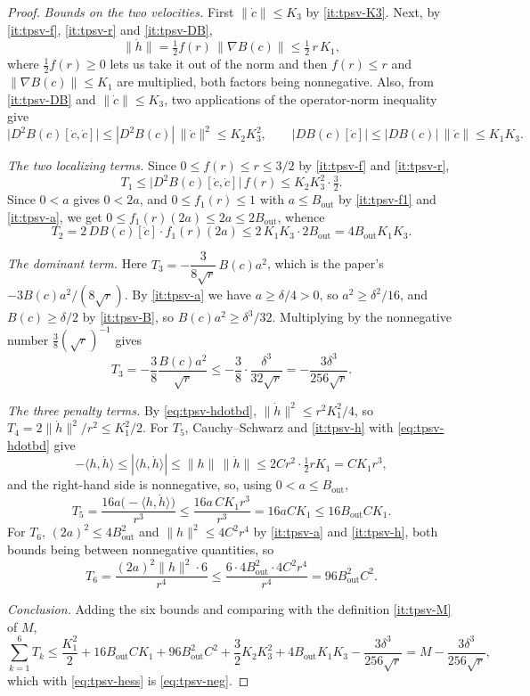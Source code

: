 \begin{proof}
\emph{Bounds on the two velocities.} First $\|\dot c\|\le K_3$ by
\ref{it:tpsv-K3}. Next, by \ref{it:tpsv-f}, \ref{it:tpsv-r} and
\ref{it:tpsv-DB},
\begin{equation}\label{eq:tpsv-hdotbd}
  \|\dot h\|=\tfrac12f(r)\,\|\nabla B(c)\|\le\tfrac12\,r\,K_1 ,
\end{equation}
where $\tfrac12f(r)\ge0$ lets us take it out of the norm and then
$f(r)\le r$ and $\|\nabla B(c)\|\le K_1$ are multiplied, both factors being
nonnegative. Also, from \ref{it:tpsv-DB} and $\|\dot c\|\le K_3$, two
applications of the operator-norm inequality give
\[
  \bigl|D^2B(c)[\dot c,\dot c]\bigr|\le|D^2B(c)|\,\|\dot c\|^2\le K_2K_3^2,
  \qquad
  \bigl|DB(c)[\dot c]\bigr|\le|DB(c)|\,\|\dot c\|\le K_1K_3 .
\]

\emph{The two localizing terms.} Since $0\le f(r)\le r\le3/2$ by
\ref{it:tpsv-f} and \ref{it:tpsv-r},
\[
  T_1\le\bigl|D^2B(c)[\dot c,\dot c]\bigr|\,f(r)\le K_2K_3^2\cdot\tfrac32 .
\]
Since $0<a$ gives $0<2a$, and $0\le f_1(r)\le1$ with $a\le B_{\mathrm{out}}$ by
\ref{it:tpsv-f1} and \ref{it:tpsv-a}, we get
$0\le f_1(r)(2a)\le2a\le2B_{\mathrm{out}}$, whence
\[
  T_2=2\,DB(c)[\dot c]\cdot f_1(r)(2a)
   \le2\,K_1K_3\cdot2B_{\mathrm{out}}=4B_{\mathrm{out}}K_1K_3 .
\]

\emph{The dominant term.} Here $T_3=-\dfrac{3}{8\sqrt r}\,B(c)a^2$, which is
the paper's $-3B(c)a^2/(8\sqrt r)$. By \ref{it:tpsv-a} we have
$a\ge\delta/4>0$, so $a^2\ge\delta^2/16$, and $B(c)\ge\delta/2$ by
\ref{it:tpsv-B}, so $B(c)a^2\ge\delta^3/32$. Multiplying by the nonnegative
number $\tfrac38(\sqrt r)^{-1}$ gives
\[
  T_3=-\frac38\frac{B(c)a^2}{\sqrt r}
    \le-\frac38\cdot\frac{\delta^3}{32\sqrt r}
    =-\frac{3\delta^3}{256\sqrt r}.
\]

\emph{The three penalty terms.} By \eqref{eq:tpsv-hdotbd},
$\|\dot h\|^2\le r^2K_1^2/4$, so $T_4=2\|\dot h\|^2/r^2\le K_1^2/2$. For
$T_5$, Cauchy--Schwarz and \ref{it:tpsv-h} with \eqref{eq:tpsv-hdotbd} give
\[
  -\langle h,\dot h\rangle\le|\langle h,\dot h\rangle|
   \le\|h\|\,\|\dot h\|\le2Cr^2\cdot\tfrac12rK_1=CK_1r^3 ,
\]
and the right-hand side is nonnegative, so, using $0<a\le B_{\mathrm{out}}$,
\[
  T_5=\frac{16a\bigl(-\langle h,\dot h\rangle\bigr)}{r^3}
   \le\frac{16a\,CK_1r^3}{r^3}=16aCK_1\le16B_{\mathrm{out}}CK_1 .
\]
For $T_6$, $(2a)^2\le4B_{\mathrm{out}}^2$ and $\|h\|^2\le4C^2r^4$ by
\ref{it:tpsv-a} and \ref{it:tpsv-h}, both bounds being between nonnegative
quantities, so
\[
  T_6=\frac{(2a)^2\|h\|^2\cdot6}{r^4}
   \le\frac{6\cdot4B_{\mathrm{out}}^2\cdot4C^2r^4}{r^4}
   =96B_{\mathrm{out}}^2C^2 .
\]

\emph{Conclusion.} Adding the six bounds and comparing with the definition
\ref{it:tpsv-M} of $M$,
\[
  \sum_{k=1}^{6}T_k
   \le\frac{K_1^2}{2}+16B_{\mathrm{out}}CK_1+96B_{\mathrm{out}}^2C^2
     +\frac32K_2K_3^2+4B_{\mathrm{out}}K_1K_3-\frac{3\delta^3}{256\sqrt r}
   =M-\frac{3\delta^3}{256\sqrt r},
\]
which with \eqref{eq:tpsv-hess} is \eqref{eq:tpsv-neg}.
\end{proof}
